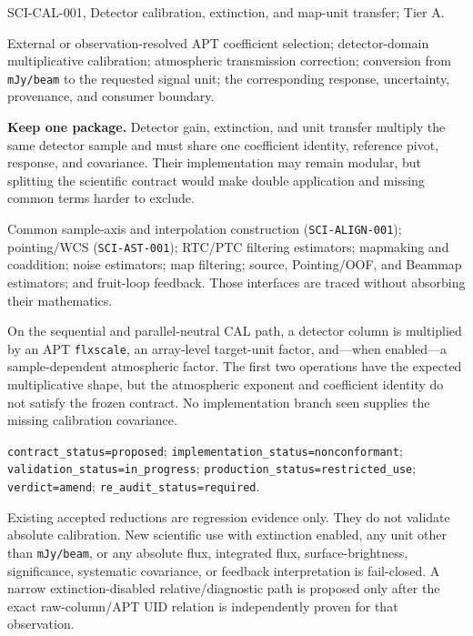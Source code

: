 \documentclass[11pt]{article}
\newcommand{\code}[1]{\nolinkurl{#1}}
\newcommand{\PackageID}{SCI-CAL-001}
\begin{document}
\begin{description}[style=nextline]
\raggedright
\item[Package and tier] \PackageID, Detector calibration, extinction, and
map-unit transfer; Tier A.
\item[Included transformation] External or observation-resolved APT
coefficient selection; detector-domain multiplicative calibration;
atmospheric transmission correction; conversion from \code{mJy/beam} to the
requested signal unit; the corresponding response, uncertainty, provenance,
and consumer boundary.
\item[Coherence decision] \textbf{Keep one package.}  Detector gain,
extinction, and unit transfer multiply the same detector sample and must share
one coefficient identity, reference pivot, response, and covariance.  Their
implementation may remain modular, but splitting the scientific contract
would make double application and missing common terms harder to exclude.
\item[Explicit exclusions] Common sample-axis and interpolation construction
(\code{SCI-ALIGN-001}); pointing/WCS (\code{SCI-AST-001}); RTC/PTC filtering
estimators; mapmaking and coaddition; noise estimators; map filtering; source,
Pointing/OOF, and Beammap estimators; and fruit-loop feedback.  Those
interfaces are traced without absorbing their mathematics.
\item[Strongest supported conclusion] On the sequential and parallel-neutral
CAL path, a detector column is multiplied by an APT \code{flxscale}, an
array-level target-unit factor, and---when enabled---a sample-dependent
atmospheric factor.  The first two operations have the expected multiplicative
shape, but the atmospheric exponent and coefficient identity do not satisfy
the frozen contract.  No implementation branch seen supplies the missing
calibration covariance.
\item[Status axes] \code{contract_status=proposed};
\code{implementation_status=nonconformant};
\code{validation_status=in_progress};
\code{production_status=restricted_use}; \code{verdict=amend};
\code{re_audit_status=required}.
\item[Consumer disposition] Existing accepted reductions are regression
evidence only.  They do not validate absolute calibration.  New scientific
use with extinction enabled, any unit other than \code{mJy/beam}, or any
absolute flux, integrated flux, surface-brightness, significance, systematic
covariance, or feedback interpretation is fail-closed.  A narrow
extinction-disabled relative/diagnostic path is proposed only after the exact
raw-column/APT UID relation is independently proven for that observation.
\end{description}
\end{document}
